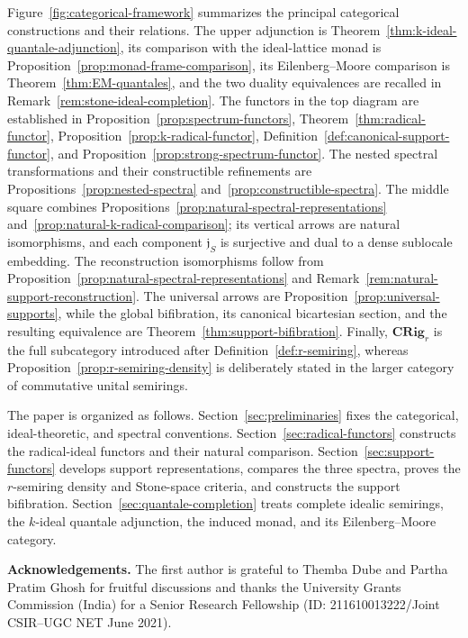 \documentclass[12pt,leqno]{amsart}
\newcommand{\CRigr}{\mathbf{CRig}_{r}}
\theoremstyle{definition}
\numberwithin{equation}{section}
\theoremstyle{remark}
\begin{document}
Figure~\ref{fig:categorical-framework} summarizes the principal categorical constructions and their relations. The upper adjunction is Theorem~\ref{thm:k-ideal-quantale-adjunction}, its comparison with the ideal-lattice monad is Proposition~\ref{prop:monad-frame-comparison}, its Eilenberg--Moore comparison is Theorem~\ref{thm:EM-quantales}, and the two duality equivalences are recalled in Remark~\ref{rem:stone-ideal-completion}. The functors in the top diagram are established in Proposition~\ref{prop:spectrum-functors}, Theorem~\ref{thm:radical-functor}, Proposition~\ref{prop:k-radical-functor}, Definition~\ref{def:canonical-support-functor}, and Proposition~\ref{prop:strong-spectrum-functor}. The nested spectral transformations and their constructible refinements are Propositions~\ref{prop:nested-spectra} and~\ref{prop:constructible-spectra}. The middle square combines Propositions~\ref{prop:natural-spectral-representations} and~\ref{prop:natural-k-radical-comparison}; its vertical arrows are natural isomorphisms, and each component \(\mathfrak j_S\) is surjective and dual to a dense sublocale embedding. The reconstruction isomorphisms follow from Proposition~\ref{prop:natural-spectral-representations} and Remark~\ref{rem:natural-support-reconstruction}. The universal arrows are Proposition~\ref{prop:universal-supports}, while the global bifibration, its canonical bicartesian section, and the resulting equivalence are Theorem~\ref{thm:support-bifibration}. Finally, \(\CRigr\) is the full subcategory introduced after Definition~\ref{def:r-semiring}, whereas Proposition~\ref{prop:r-semiring-density} is deliberately stated in the larger category of commutative unital semirings.

The paper is organized as follows. Section~\ref{sec:preliminaries} fixes the categorical, ideal-theoretic, and spectral conventions. Section~\ref{sec:radical-functors} constructs the radical-ideal functors and their natural comparison. Section~\ref{sec:support-functors} develops support representations, compares the three spectra, proves the $r$-semiring density and Stone-space criteria, and constructs the support bifibration. Section~\ref{sec:quantale-completion} treats complete idealic semirings, the $k$-ideal quantale adjunction, the induced monad, and its Eilenberg--Moore category.

\medskip
\noindent\textbf{Acknowledgements.}
The first author is grateful to Themba Dube and Partha Pratim Ghosh for fruitful discussions and thanks the University Grants Commission (India) for a Senior Research Fellowship (ID: 211610013222/Joint CSIR--UGC NET June 2021).
\end{document}
